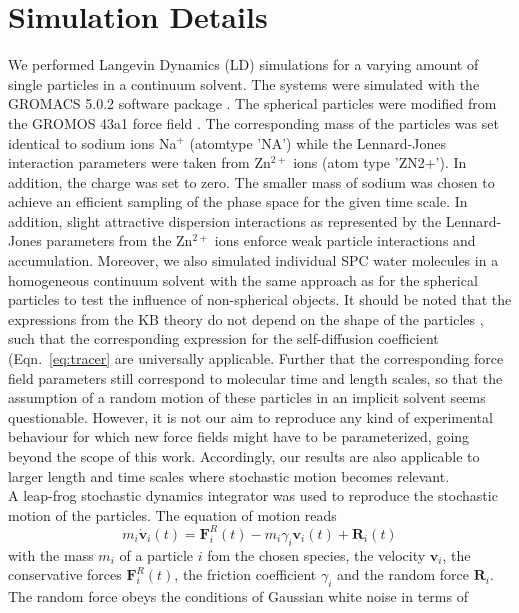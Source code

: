 \documentclass[aip,jcp,reprint]{revtex4-1}
\begin{document}
\section{Simulation Details}
We performed  Langevin Dynamics (LD) simulations for a varying amount of single particles in a continuum solvent. The systems were simulated with  the GROMACS 5.0.2 software package \cite{vanderspoel05a,gromacs08a,pronk13a}.
The spherical particles were modified from  the GROMOS 43a1 force field \cite{gunsteren96a}. The corresponding mass of the particles was set identical to sodium ions Na$^+$ (atomtype 'NA') while the Lennard-Jones interaction parameters were taken from Zn$^{2+}$ ions (atom type 'ZN2+'). In addition, the charge was set to zero. The smaller mass of sodium was chosen to achieve an efficient sampling of the phase space for the given time scale. In addition, slight attractive dispersion interactions as represented by the Lennard-Jones parameters from the Zn$^{2+}$ ions enforce weak particle interactions and accumulation.
Moreover, we also simulated individual SPC water molecules \cite{berendsen81a} in a homogeneous continuum solvent with the same approach as for the spherical particles to test the influence of non-spherical objects. It should be noted that the expressions from the KB theory do not depend on the shape of the particles \cite{ben13a,smiatek17a,smith06,pierce08a}, such that the corresponding expression for the self-diffusion coefficient (Eqn.~\eqref{eq:tracer} are universally applicable.
Further that the corresponding force field parameters still correspond to molecular time and length scales, so that the assumption of a random motion of these particles in an implicit solvent seems questionable. However, it is not our aim to reproduce any kind of experimental behaviour for which new force fields might have to be parameterized, going beyond the scope of this work. Accordingly, our results are also applicable to larger length and time scales where stochastic motion becomes relevant.\\
A leap-frog stochastic dynamics integrator \cite{vangunsteren88a} was used to reproduce the stochastic motion of the particles. The equation of motion reads
\begin{equation}
	\label{eq:LD}
	m_i\dot{\textbf{v}}_i(t) = {\textbf{F}}_i^R(t)-m_i\gamma_i{\textbf{v}}_i(t)+{\textbf{R}}_i(t)
\end{equation}
with the mass $m_i$ of a particle $i$ fom the chosen species, the velocity $\textbf{v}_i$, the conservative forces $ {\textbf{F}}_i^R(t)$, the friction coefficient $\gamma_i$ and the random force ${\textbf{R}}_i$. The random force obeys the conditions of Gaussian white noise in terms of
\end{document}
